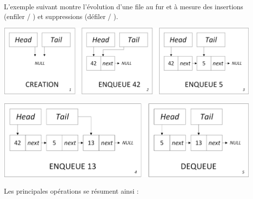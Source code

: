 \documentclass[11pt,a4paper]{article}
\begin{document}
\smallskip

L'exemple suivant montre l'évolution d'une file au fur et à mesure des insertions (enfiler / ) et suppressions (défiler / ).\\

\begin{center}
\includegraphics[scale=0.60]{img/files/Files_4_Liste_Chainee_Usage_pack_1.png}
\end{center}

\begin{center}
\includegraphics[scale=0.60]{img/files/Files_4_Liste_Chainee_Usage_pack_2.png}
\end{center}

\smallskip

Les principales opérations se résument ainsi :
\end{document}
